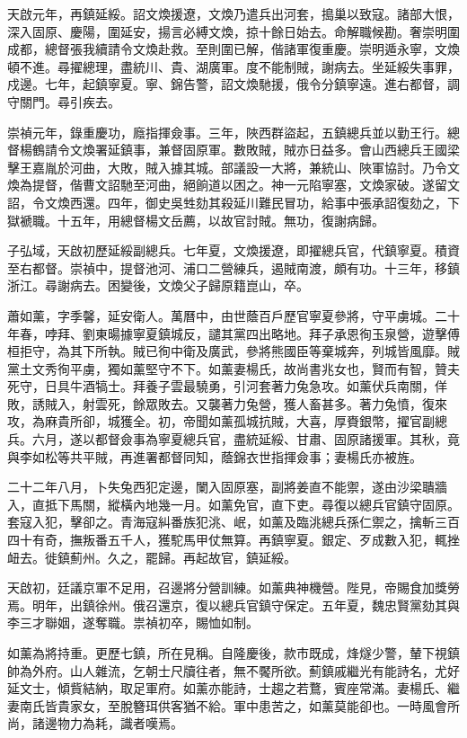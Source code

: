 \begin{pinyinscope}
天啟元年，再鎮延綏。詔文煥援遼，文煥乃遣兵出河套，搗巢以致寇。諸部大恨，深入固原、慶陽，圍延安，揚言必縛文煥，掠十餘日始去。命解職候勘。奢崇明圍成都，總督張我續請令文煥赴救。至則圍已解，偕諸軍復重慶。崇明遁永寧，文煥頓不進。尋擢總理，盡統川、貴、湖廣軍。度不能制賊，謝病去。坐延綏失事罪，戍邊。七年，起鎮寧夏。寧、錦告警，詔文煥馳援，俄令分鎮寧遠。進右都督，調守關門。尋引疾去。

崇禎元年，錄重慶功，廕指揮僉事。三年，陜西群盜起，五鎮總兵並以勤王行。總督楊鶴請令文煥署延鎮事，兼督固原軍。數敗賊，賊亦日益多。會山西總兵王國梁擊王嘉胤於河曲，大敗，賊入據其城。部議設一大將，兼統山、陜軍協討。乃令文煥為提督，偕曹文詔馳至河曲，絕餉道以困之。神一元陷寧塞，文煥家破。遂留文詔，令文煥西還。四年，御史吳甡劾其殺延川難民冒功，給事中張承詔復劾之，下獄褫職。十五年，用總督楊文岳薦，以故官討賊。無功，復謝病歸。

子弘域，天啟初歷延綏副總兵。七年夏，文煥援遼，即擢總兵官，代鎮寧夏。積資至右都督。崇禎中，提督池河、浦口二營練兵，遏賊南渡，頗有功。十三年，移鎮浙江。尋謝病去。困變後，文煥父子歸原籍崑山，卒。

蕭如薰，字季馨，延安衛人。萬曆中，由世蔭百戶歷官寧夏參將，守平虜城。二十年春，哱拜、劉東暘據寧夏鎮城反，譴其黨四出略地。拜子承恩徇玉泉營，遊擊傅桓拒守，為其下所執。賊已徇中衛及廣武，參將熊國臣等棄城奔，列城皆風靡。賊黨土文秀徇平虜，獨如薰堅守不下。如薰妻楊氏，故尚書兆女也，賢而有智，贊夫死守，日具牛酒犒士。拜養子雲最驍勇，引河套著力兔急攻。如薰伏兵南關，佯敗，誘賊入，射雲死，餘眾敗去。又襲著力兔營，獲人畜甚多。著力兔憤，復來攻，為麻貴所卻，城獲全。初，帝聞如薰孤城抗賊，大喜，厚賚銀幣，擢官副總兵。六月，遂以都督僉事為寧夏總兵官，盡統延綏、甘肅、固原諸援軍。其秋，竟與李如松等共平賊，再進署都督同知，蔭錦衣世指揮僉事；妻楊氏亦被旌。

二十二年八月，卜失兔西犯定邊，闌入固原塞，副將姜直不能禦，遂由沙梁聵牆入，直抵下馬關，縱橫內地幾一月。如薰免官，直下吏。尋復以總兵官鎮守固原。套寇入犯，擊卻之。青海寇糾番族犯洮、岷，如薰及臨洮總兵孫仁禦之，擒斬三百四十有奇，撫叛番五千人，獲駝馬甲仗無算。再鎮寧夏。銀定、歹成數入犯，輒挫衄去。徙鎮薊州。久之，罷歸。再起故官，鎮延綏。

天啟初，廷議京軍不足用，召邊將分營訓練。如薰典神機營。陛見，帝賜食加獎勞焉。明年，出鎮徐州。俄召還京，復以總兵官鎮守保定。五年夏，魏忠賢黨劾其與李三才聯姻，遂奪職。祟禎初卒，賜恤如制。

如薰為將持重。更歷七鎮，所在見稱。自隆慶後，款市既成，烽燧少警，輦下視鎮帥為外府。山人雜流，乞朝士尺牘往者，無不饜所欲。薊鎮戚繼光有能詩名，尤好延文士，傾貲結納，取足軍府。如薰亦能詩，士趨之若鶩，賓座常滿。妻楊氏、繼妻南氏皆貴家女，至脫簪珥供客猶不給。軍中患苦之，如薰莫能卻也。一時風會所尚，諸邊物力為耗，識者嘆焉。


\end{pinyinscope}
